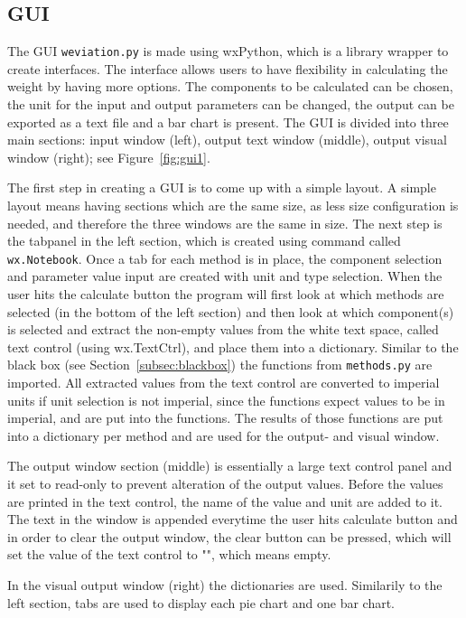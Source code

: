 \subsection{GUI}
\label{subsec:gui}

The GUI \texttt{weviation.py} is made using wxPython, which is a library wrapper to create interfaces.
The interface allows users to have flexibility in calculating the weight by having more options.
The components to be calculated can be chosen, the unit for the input and output  parameters can be changed, the output can be exported as a text file and a bar chart is present.
The GUI is divided into three main sections: input window (left), output text window (middle), output visual window (right); see Figure~\ref{fig:gui1}.

The first step in creating a GUI is to come up with a simple layout.
A simple layout means having sections which are the same size, as less size configuration is needed, and therefore the three windows are the same in size.
The next step is the tabpanel in the left section, which is created using command called \texttt{wx.Notebook}.
Once a tab for each method is in place, the component selection and parameter value input are created with unit and type selection.
When the user hits the calculate button the program will first look at which methods are selected (in the bottom of the left section) and then look at which component(s) is selected and extract the non-empty values from the white text space, called text control (using wx.TextCtrl), and place them into a dictionary.
Similar to the black box (see Section~\ref{subsec:blackbox}) the functions from \texttt{methods.py} are imported.
All extracted values from the text control are converted to imperial units if unit selection is not imperial, since the functions expect values to be in imperial, and are put into the functions.
The results of those functions are put into a dictionary per method and are used for the output- and visual  window.

The output window section (middle) is essentially a large text control panel and it set to read-only to prevent alteration of the output values.
Before the values are printed in the text control, the name of the value and unit are added to it.
The text in the window is appended everytime the user hits calculate button and in order to clear the output window, the clear button can be pressed, which will set the value of the text control to "", which means empty.

In the visual output window (right) the dictionaries are used.
Similarily to the left section, tabs are used to display each pie chart and one bar chart.

